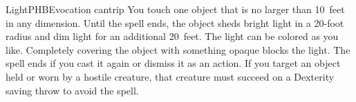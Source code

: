 \begin{spell}{Light}{PHB}{Evocation cantrip}
{
}
You touch one object that is no larger than 10~feet in any
dimension. Until the spell ends, the object sheds bright
light in a 20-foot radius and dim light for an additional
20~feet. The light can be colored as you like. Completely
covering the object with something opaque blocks the light.
The spell ends if you cast it again or dismiss it as an
action. If you target an object held or worn by a hostile
creature, that creature must succeed on a Dexterity saving
throw to avoid the spell.
\end{spell}
